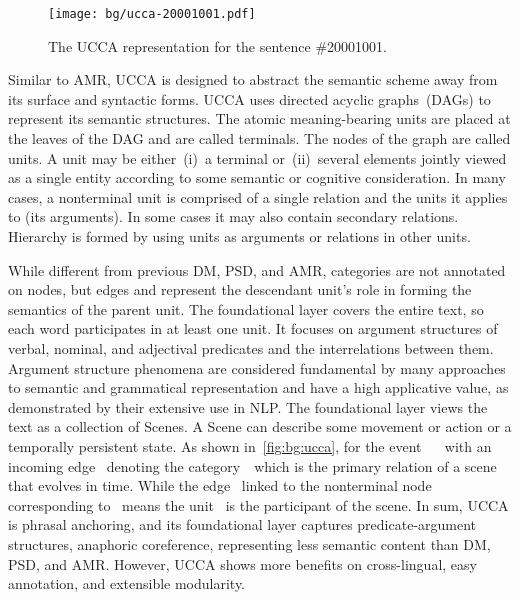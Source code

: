 \begin{figure}[!tbp]
\begin{center}
\texttt{[image: bg/ucca-20001001.pdf]}
\end{center}
\caption{\label{fig:bg:ucca}The UCCA representation for the sentence
  \#20001001.}
\end{figure}

Similar to AMR, UCCA is designed to abstract the semantic scheme away
from its surface and syntactic forms. UCCA uses directed acyclic
graphs~(DAGs) to represent its semantic structures. The atomic
meaning-bearing units are placed at the leaves of the DAG and are
called terminals. The nodes of the graph are called units. A unit may
be either~(i)~a terminal or~(ii)~several elements jointly viewed as a
single entity according to some semantic or cognitive
consideration. In many cases, a nonterminal unit is comprised of a
single relation and the units it applies to (its arguments). In some
cases it may also contain secondary relations. Hierarchy is formed by
using units as arguments or relations in other units.

While different from previous DM, PSD, and AMR, categories are not
annotated on nodes, but edges and represent the descendant unit's role
in forming the semantics of the parent unit. The foundational layer
covers the entire text, so each word participates in at least one
unit. It focuses on argument structures of verbal, nominal, and
adjectival predicates and the interrelations between them. Argument
structure phenomena are considered fundamental by many approaches to
semantic and grammatical representation and have a high applicative
value, as demonstrated by their extensive use in NLP. The foundational
layer views the text as a collection of Scenes. A Scene can describe
some movement or action or a temporally persistent state. As shown
in~\autoref{fig:bg:ucca}, for the event~
~ with an incoming edge~ denoting the
category~~which is the primary relation of a scene
that evolves in time. While the edge~ linked to the
nonterminal node corresponding to~ means the unit~ is the participant of
the scene. In sum, UCCA is phrasal anchoring, and its foundational
layer captures predicate-argument structures, anaphoric coreference,
representing less semantic content than DM, PSD, and AMR. However,
UCCA shows more benefits on cross-lingual, easy annotation, and
extensible modularity.


